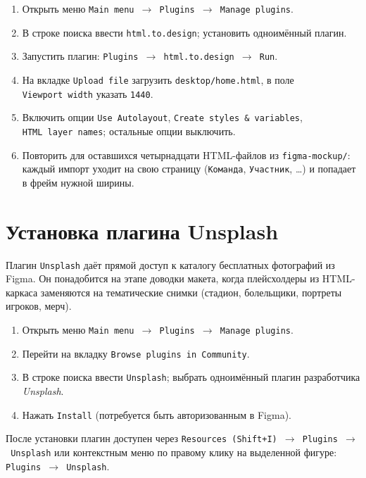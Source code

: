 \begin{enumerate}
  \item Открыть меню \texttt{Main~menu~\(\rightarrow\)~Plugins~\(\rightarrow\)
        Manage plugins}.
  \item В строке поиска ввести \texttt{html.to.design}; установить
        одноимённый плагин.
  \item Запустить плагин: \texttt{Plugins~\(\rightarrow\)
        html.to.design~\(\rightarrow\)~Run}.
  \item На вкладке \texttt{Upload file} загрузить
        \texttt{desktop/home.html}, в поле \texttt{Viewport~width}
        указать \texttt{1440}.
  \item Включить опции \texttt{Use~Autolayout},
        \texttt{Create~styles~\&~variables},
        \texttt{HTML~layer~names}; остальные опции выключить.
  \item Повторить для оставшихся четырнадцати HTML-файлов из
        \texttt{figma-mockup/}: каждый импорт уходит на свою страницу
        (\texttt{Команда}, \texttt{Участник}, \ldots) и попадает в
        фрейм нужной ширины.
\end{enumerate}

\section{Установка плагина Unsplash}

Плагин \texttt{Unsplash} даёт прямой доступ к каталогу бесплатных
фотографий из Figma. Он понадобится на этапе доводки макета, когда
плейсхолдеры из HTML-каркаса заменяются на тематические снимки
(стадион, болельщики, портреты игроков, мерч).

\begin{enumerate}
  \item Открыть меню \texttt{Main~menu~\(\rightarrow\)~Plugins~\(\rightarrow\)
        Manage plugins}.
  \item Перейти на вкладку \texttt{Browse plugins in Community}.
  \item В строке поиска ввести \texttt{Unsplash}; выбрать одноимённый
        плагин разработчика \textit{Unsplash}.
  \item Нажать \texttt{Install} (потребуется быть авторизованным
        в Figma).
\end{enumerate}

После установки плагин доступен через
\texttt{Resources~(Shift+I)~\(\rightarrow\)~Plugins~\(\rightarrow\)~Unsplash}
или контекстным меню по правому клику на выделенной фигуре:
\texttt{Plugins~\(\rightarrow\)~Unsplash}.


